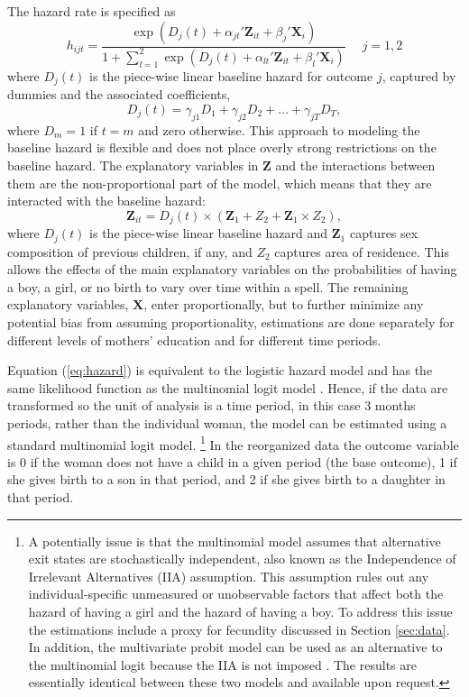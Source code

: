 \documentclass[12pt,letterpaper]{article}
\begin{document}
The hazard rate is specified as
\begin{equation}
 h_{ijt} = \frac{\exp(D_j(t) + \alpha_{jt}'\mathbf{Z}_{it} + \beta_j'\mathbf{X}_{i})} 
 {1 + \sum_{l=1}^2 \exp(D_j(t) + \alpha_{lt}'\mathbf{Z}_{it} + \beta_l'\mathbf{X}_{i})} \: \: \; \; \;  j = 1,2
 \label{eq:hazard}
\end{equation}
where $D_{j}(t)$ is the piece-wise linear baseline hazard for outcome $j$, captured
by dummies and the associated coefficients,
\begin{equation}
D_j(t) = \gamma_{j1} D_1 + \gamma_{j2} D_2 + \ldots + \gamma_{jT} D_T,
\end{equation}
where $D_m = 1$ if $t=m$ and zero otherwise.
This approach to modeling the baseline hazard is flexible and does not place 
overly strong restrictions on the baseline hazard.
The explanatory variables in $\mathbf{Z}$ and the interactions between them 
are the non-proportional part of the model, which means that they are
interacted with the baseline hazard:
\begin{equation}
 \mathbf{Z}_{it} = D_j(t) \times (\mathbf{Z}_1 + Z_2 + \mathbf{Z}_1 \times Z_2),
\end{equation}
where $D_j(t)$ is the piece-wise linear baseline hazard and $\mathbf{Z}_1$ captures sex 
composition of previous children, if any, and $Z_2$ captures area of residence.
This allows the effects of the main explanatory variables on the probabilities 
of having a boy, a girl, or no birth to vary over time within a spell.
The remaining explanatory variables, $\mathbf{X}$, enter proportionally,
but to further minimize any potential bias from assuming proportionality, estimations 
are done separately for different levels of mothers' education and for different 
time periods.

Equation (\ref{eq:hazard}) is equivalent to the logistic hazard model and has the same 
likelihood function as the multinomial logit model \citep{allison82,jenkins95}.
Hence, if the data are transformed so the unit of analysis is a time period, in 
this case 3 months periods, rather than the individual woman, the model can be 
estimated using a standard multinomial logit model.%
\footnote{
A potentially issue is that the multinomial model assumes that alternative 
exit states are stochastically independent,
also known as the Independence of Irrelevant Alternatives (IIA) assumption.
This assumption rules out any individual-specific unmeasured or 
unobservable factors that affect both the hazard of having a girl and the 
hazard of having a boy.
To address this issue the estimations include a proxy for fecundity
discussed in Section \ref{sec:data}.
In addition, the multivariate probit model can be used as an alternative
to the multinomial logit because the IIA is not imposed \citep{han90}.
The results are essentially identical between these two models and
available upon request.
}
In the reorganized data the outcome variable is 0 if the
woman does not have a child in a given period (the base outcome), 1 if 
she gives birth to a son in that period, and 2 if she gives birth to 
a daughter in that period.
\end{document}
